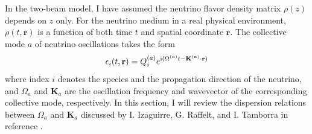 In the two-beam model, I have assumed the neutrino flavor density matrix $\rho(z)$ depends on $z$ only. For the neutrino medium in a real physical environment, $\rho(t,\mathbf r)$ is a function of both time $t$ and spatial coordinate $\mathbf r$. The collective mode $a$ of neutrino oscillations takes the form
\begin{equation}
    \epsilon_i(t,\mathbf r) = Q_{i}^{(a)} e^{\ri (\Omega^{(a)} t - \mathbf K^{(a)} \cdot \mathbf r) }
    \label{chap:collective-sec:dispersion-relation-eqn:collective-mode-epsilon}
\end{equation}
where index $i$ denotes the species and the propagation direction of the neutrino, and $\Omega_a$ and $\mathbf K_a$ are the oscillation frequency and wavevector of the corresponding collective mode, respectively.  In this section, I will review the dispersion relations between $\Omega_a$ and $\mathbf K_a$ discussed by I. Izaguirre, G. Raffelt, and I. Tamborra in reference \cite{Izaguirre2016a}.


